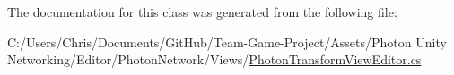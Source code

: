 The documentation for this class was generated from the following file\+:\begin{DoxyCompactItemize}
\item 
C\+:/\+Users/\+Chris/\+Documents/\+Git\+Hub/\+Team-\/\+Game-\/\+Project/\+Assets/\+Photon Unity Networking/\+Editor/\+Photon\+Network/\+Views/\hyperlink{_photon_transform_view_editor_8cs}{Photon\+Transform\+View\+Editor.\+cs}\end{DoxyCompactItemize}
